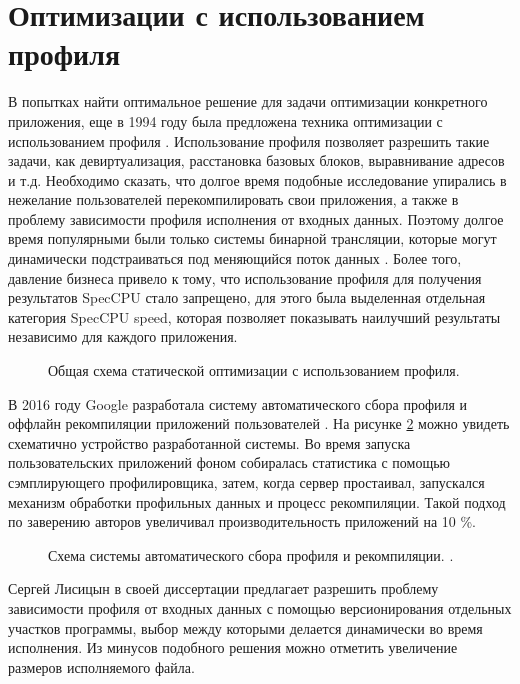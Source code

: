 \section{Оптимизации с использованием профиля} \label{pr:pgo}
В попытках  найти оптимальное решение для задачи оптимизации конкретного приложения, еще в 1994 году была предложена техника оптимизации с использованием профиля \cite{liew1994feedback}. Использование профиля позволяет разрешить такие задачи, как девиртуализация, расстановка базовых блоков, выравнивание адресов и т.д. Необходимо сказать, что долгое время подобные исследование упирались в нежелание пользователей перекомпилировать свои приложения, а также в проблему зависимости профиля исполнения от входных данных. Поэтому долгое  время популярными были только системы бинарной трансляции, которые могут динамически подстраиваться под меняющийся поток данных \cite{dange2014systematic}. Более того, давление бизнеса привело к тому, что использование профиля для получения результатов SpecCPU стало запрещено, для этого была выделенная отдельная категория SpecCPU speed, которая позволяет показывать наилучший результаты независимо для каждого приложения.
 \begin{figure}[htbp]
	\centering
	
	\caption{Общая схема статической оптимизации с использованием профиля.}
	\label{partReview:fdo1}
\end{figure}

В 2016 году Google разработала систему автоматического сбора профиля и оффлайн рекомпиляции приложений пользователей \cite{chen2016autofdo}. На рисунке \ref{partReview:fdo2} можно увидеть схематично устройство разработанной системы. Во время запуска пользовательских приложений фоном собиралась статистика с помощью сэмплирующего профилировщика, затем, когда сервер простаивал, запускался механизм обработки профильных данных и процесс рекомпиляции. Такой подход по заверению авторов увеличивал производительность приложений на 10 \%.  

\begin{figure}[ht]
	\caption{Схема системы автоматического сбора профиля и рекомпиляции. \cite{chen2016autofdo}.}\label{partReview:fdo2}
\end{figure}

Сергей Лисицын  в своей диссертации \cite{SergeyL1} предлагает разрешить проблему зависимости профиля от входных данных с помощью версионирования отдельных участков программы, выбор между которыми делается динамически во время исполнения. Из минусов подобного решения можно отметить увеличение размеров исполняемого файла.

